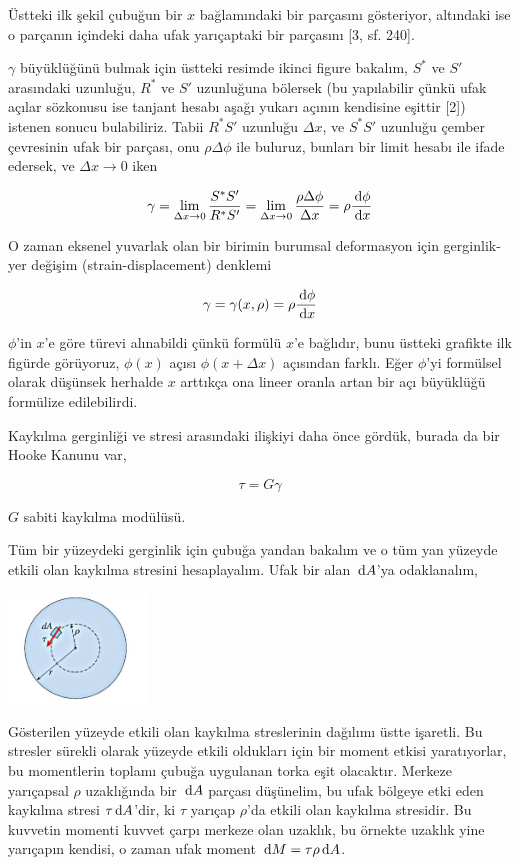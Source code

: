 \documentclass[12pt,fleqn]{article}\usepackage{../../common}
\begin{document}
Üstteki ilk şekil çubuğun bir $x$ bağlamındaki bir parçasını gösteriyor,
altındaki ise o parçanın içindeki daha ufak yarıçaptaki bir parçasını [3, sf. 240]. 

$\gamma$ büyüklüğünü bulmak için üstteki resimde ikinci figure bakalım, $S^*$ ve
$S'$ arasındaki uzunluğu, $R^*$ ve $S'$ uzunluğuna bölersek (bu yapılabilir
çünkü ufak açılar sözkonusu ise tanjant hesabı aşağı yukarı açının kendisine
eşittir [2]) istenen sonucu bulabiliriz. Tabii $R^*S'$ uzunluğu $\Delta x$,
ve $S^*S'$ uzunluğu çember çevresinin ufak bir parçası, onu  $\rho \Delta \phi$
ile buluruz, bunları bir limit hesabı ile ifade edersek, ve $\Delta x \to 0$
iken

$$
\gamma = \lim_{\Delta x \to 0} \frac{S^*S'}{R^*S'} =
\lim_{\Delta x \to 0} \frac{\rho \Delta \phi}{\Delta x} =
\rho \frac{\,\mathrm{d} \phi}{\,\mathrm{d} x}
$$

O zaman eksenel yuvarlak olan bir birimin burumsal deformasyon için
gerginlik-yer değişim (strain-displacement) denklemi

$$
\gamma = \gamma(x,\rho) = \rho \frac{\,\mathrm{d} \phi}{\,\mathrm{d} x}
$$

$\phi$'in $x$'e göre türevi alınabildi çünkü formülü $x$'e bağlıdır, bunu
üstteki grafikte ilk figürde görüyoruz, $\phi(x)$ açısı $\phi(x+\Delta x)$
açısından farklı. Eğer $\phi$'yi formülsel olarak düşünsek herhalde $x$ arttıkça
ona lineer oranla artan bir açı büyüklüğü formülize edilebilirdi.

Kaykılma gerginliği ve stresi arasındaki ilişkiyi daha önce gördük, burada da
bir Hooke Kanunu var,

$$
\tau = G \gamma
$$

$G$ sabiti kaykılma modülüsü. 

Tüm bir yüzeydeki gerginlik için çubuğa yandan bakalım ve o tüm yan yüzeyde
etkili olan kaykılma stresini hesaplayalım. Ufak bir alan $\,\mathrm{d} A$'ya
odaklanalım,

\includegraphics[width=10em]{phy_020_strs_06_04.jpg}

Gösterilen yüzeyde etkili olan kaykılma streslerinin dağılımı üstte işaretli. Bu
stresler sürekli olarak yüzeyde etkili oldukları için bir moment etkisi
yaratıyorlar, bu momentlerin toplamı çubuğa uygulanan torka eşit
olacaktır. Merkeze yarıçapsal $\rho$ uzaklığında bir $\,\mathrm{d} A$ parçası düşünelim,
bu ufak bölgeye etki eden kaykılma stresi $\tau \,\mathrm{d} A$'dir, ki $\tau$ yarıçap
$\rho$'da etkili olan kaykılma stresidir. Bu kuvvetin momenti kuvvet çarpı
merkeze olan uzaklık, bu örnekte uzaklık yine yarıçapın kendisi, o zaman ufak
moment $\,\mathrm{d} M = \tau \rho \,\mathrm{d} A$.
\end{document}
